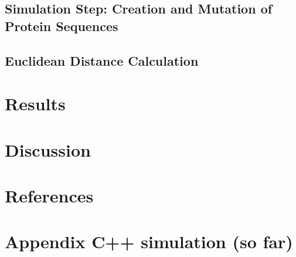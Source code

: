 \documentclass{article}
\begin{document}
\subsection{Simulation Step: Creation and Mutation of Protein Sequences}

\subsection{Euclidean Distance Calculation}

\section{Results}





\section{Discussion}

\clearpage\newpage
\section{References}


\nocite{*}
\printbibliography[heading=none, sorting=nyt]
\newpage

\section{Appendix C++ simulation (so far)}

\end{document}
